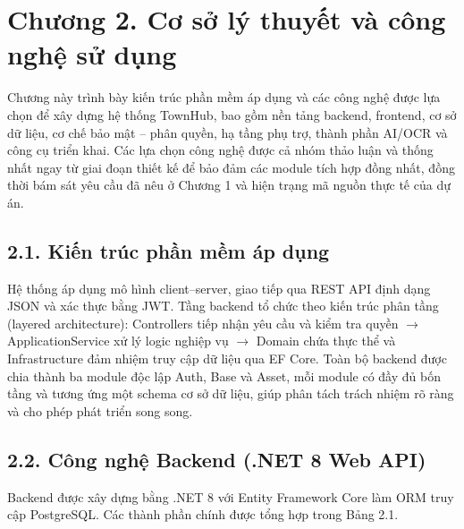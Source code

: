 \chapter*{Chương 2. Cơ sở lý thuyết và công nghệ sử dụng}
Chương này trình bày kiến trúc phần mềm áp dụng và các công nghệ được lựa chọn để xây dựng hệ thống TownHub, bao gồm nền tảng backend, frontend, cơ sở dữ liệu, cơ chế bảo mật – phân quyền, hạ tầng phụ trợ, thành phần AI/OCR và công cụ triển khai. Các lựa chọn công nghệ được cả nhóm thảo luận và thống nhất ngay từ giai đoạn thiết kế để bảo đảm các module tích hợp đồng nhất, đồng thời bám sát yêu cầu đã nêu ở Chương 1 và hiện trạng mã nguồn thực tế của dự án.

\section*{2.1. Kiến trúc phần mềm áp dụng}
Hệ thống áp dụng mô hình client–server, giao tiếp qua REST API định dạng JSON và xác thực bằng JWT. Tầng backend tổ chức theo kiến trúc phân tầng (layered architecture): Controllers tiếp nhận yêu cầu và kiểm tra quyền $\rightarrow$ ApplicationService xử lý logic nghiệp vụ $\rightarrow$ Domain chứa thực thể và Infrastructure đảm nhiệm truy cập dữ liệu qua EF Core. Toàn bộ backend được chia thành ba module độc lập Auth, Base và Asset, mỗi module có đầy đủ bốn tầng và tương ứng một schema cơ sở dữ liệu, giúp phân tách trách nhiệm rõ ràng và cho phép phát triển song song.

\section*{2.2. Công nghệ Backend (.NET 8 Web API)}
Backend được xây dựng bằng .NET 8 với Entity Framework Core làm ORM truy cập PostgreSQL. Các thành phần chính được tổng hợp trong Bảng 2.1.

